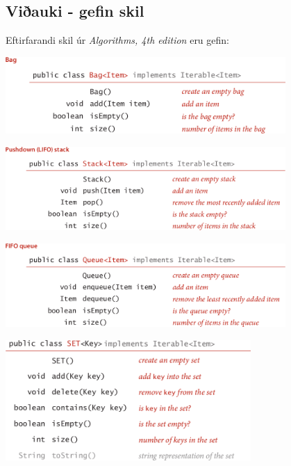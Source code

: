 \documentclass[addpoints]{exam}
\begin{document}
\begin{questions}
	\newpage
	\section{Viðauki - gefin skil}
	Eftirfarandi skil úr \emph{Algorithms, 4th edition} eru gefin:
	\begin{center}
		\includegraphics[width=0.8\textwidth]{Pics/API-Bag}

		\vspace{0.5cm}

		\includegraphics[width=0.8\textwidth]{Pics/API-Stack}

		\vspace{0.5cm}

		\includegraphics[width=0.8\textwidth]{Pics/API-Queue}

		\vspace{0.5cm}

		\hspace{2cm} \includegraphics[width=0.7\textwidth]{Pics/API-SET}

		\vspace{1cm}


\end{center}
\end{questions}
\end{document}
